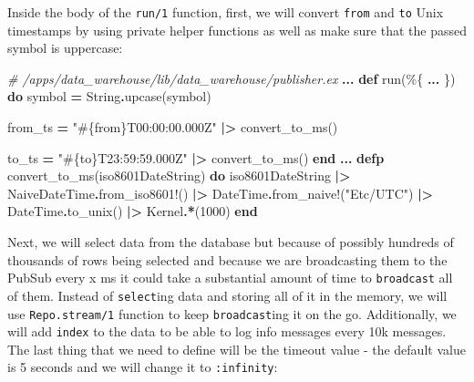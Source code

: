 \documentclass[
  oneside]{book}
\newenvironment{Shaded}{\begin{snugshade}}{\end{snugshade}}
\newcommand{\CommentTok}[1]{\textcolor[rgb]{0.56,0.35,0.01}{\textit{#1}}}
\newcommand{\ConstantTok}[1]{\textcolor[rgb]{0.00,0.00,0.00}{#1}}
\newcommand{\DecValTok}[1]{\textcolor[rgb]{0.00,0.00,0.81}{#1}}
\newcommand{\KeywordTok}[1]{\textcolor[rgb]{0.13,0.29,0.53}{\textbf{#1}}}
\newcommand{\NormalTok}[1]{#1}
\newcommand{\OperatorTok}[1]{\textcolor[rgb]{0.81,0.36,0.00}{\textbf{#1}}}
\newcommand{\OtherTok}[1]{\textcolor[rgb]{0.56,0.35,0.01}{#1}}
\newcommand{\StringTok}[1]{\textcolor[rgb]{0.31,0.60,0.02}{#1}}
\begin{document}
Inside the body of the \texttt{run/1} function, first, we will convert \texttt{from} and \texttt{to} Unix timestamps by using private helper functions as well as make sure that the passed symbol is uppercase:

\begin{Shaded}
\begin{Highlighting}[]
  \CommentTok{\# /apps/data\_warehouse/lib/data\_warehouse/publisher.ex  }
  \OperatorTok{...}
  \KeywordTok{def}\NormalTok{ run(\%\{}
        \OperatorTok{...}
\NormalTok{      \}) }\KeywordTok{do}
\NormalTok{    symbol }\OperatorTok{=} \ConstantTok{String}\OperatorTok{.}\NormalTok{upcase(symbol)}

\NormalTok{    from\_ts }\OperatorTok{=}
      \StringTok{"}\OtherTok{\#\{}\NormalTok{from}\OtherTok{\}}\StringTok{T00:00:00.000Z"}
      \OperatorTok{|\textgreater{}}\NormalTok{ convert\_to\_ms()}

\NormalTok{    to\_ts }\OperatorTok{=}
      \StringTok{"}\OtherTok{\#\{}\NormalTok{to}\OtherTok{\}}\StringTok{T23:59:59.000Z"}
      \OperatorTok{|\textgreater{}}\NormalTok{ convert\_to\_ms()}
  \KeywordTok{end}
  \OperatorTok{...}
  \KeywordTok{defp}\NormalTok{ convert\_to\_ms(iso8601DateString) }\KeywordTok{do}
\NormalTok{    iso8601DateString}
    \OperatorTok{|\textgreater{}} \ConstantTok{NaiveDateTime}\OperatorTok{.}\NormalTok{from\_iso8601!()}
    \OperatorTok{|\textgreater{}} \ConstantTok{DateTime}\OperatorTok{.}\NormalTok{from\_naive!(}\StringTok{"Etc/UTC"}\NormalTok{)}
    \OperatorTok{|\textgreater{}} \ConstantTok{DateTime}\OperatorTok{.}\NormalTok{to\_unix()}
    \OperatorTok{|\textgreater{}} \ConstantTok{Kernel}\OperatorTok{.*}\NormalTok{(}\DecValTok{1000}\NormalTok{)}
  \KeywordTok{end}
\end{Highlighting}
\end{Shaded}

Next, we will select data from the database but because of possibly hundreds of thousands of rows being selected and because we are broadcasting them to the PubSub every x ms it could take a substantial amount of time to \texttt{broadcast} all of them. Instead of \texttt{select}ing data and storing all of it in the memory, we will use \texttt{Repo.stream/1} function to keep \texttt{broadcast}ing it on the go. Additionally, we will add \texttt{index} to the data to be able to log info messages every 10k messages. The last thing that we need to define will be the timeout value - the default value is 5 seconds and we will change it to \texttt{:infinity}:
\end{document}
